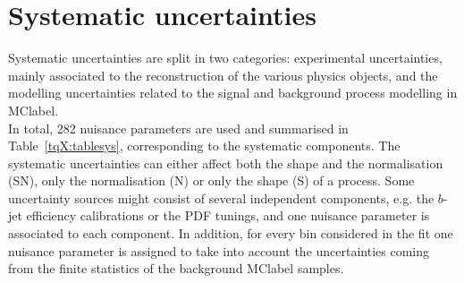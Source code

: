 \section{Systematic uncertainties}
Systematic uncertainties are split in two categories: experimental uncertainties, mainly associated to the reconstruction of the various physics objects, and the modelling uncertainties related to the signal and background process modelling in \acrshort{MClabel}.\\

In total, 282 nuisance parameters are used and summarised in Table~\ref{tqX:tablesys}, corresponding to the systematic components. The systematic uncertainties can either affect both the shape and the normalisation (SN), only the normalisation (N) or only the shape (S) of a process. Some uncertainty sources might consist of several independent components, e.g. the $b$-jet efficiency calibrations or the PDF tunings, and one nuisance parameter is associated to each component. In addition, for every bin considered in the fit one nuisance parameter is assigned to take into account the uncertainties coming from the finite statistics of the background \acrshort{MClabel} samples.

